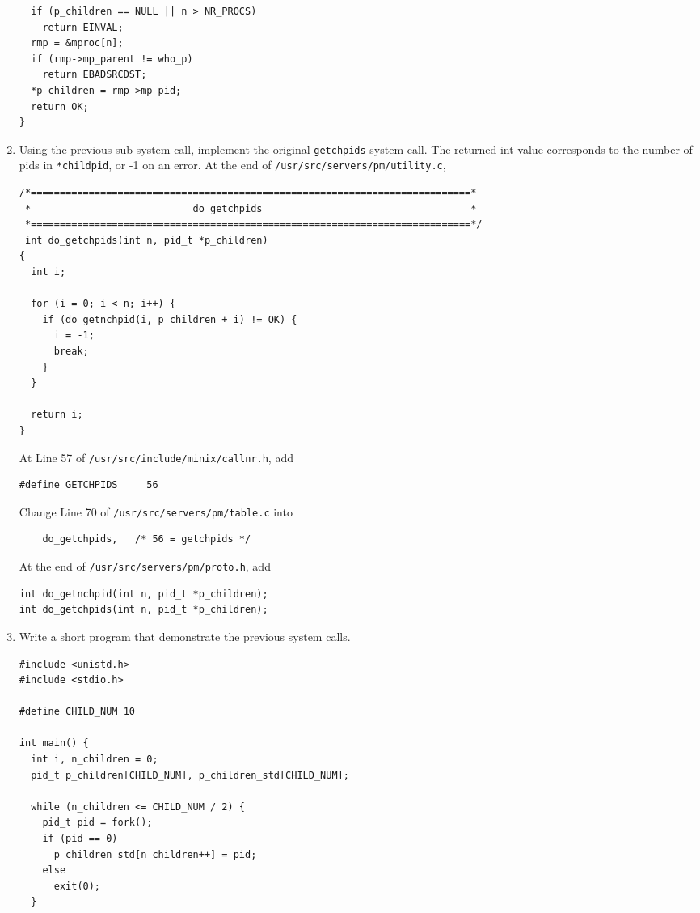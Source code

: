 \documentclass[a4paper]{article}
\begin{document}
\begin{enumerate}
\begin{verbatim}
  if (p_children == NULL || n > NR_PROCS)
  	return EINVAL;
  rmp = &mproc[n];
  if (rmp->mp_parent != who_p)
  	return EBADSRCDST;
  *p_children = rmp->mp_pid;
  return OK;
}
    \end{verbatim}
    \item Using the previous sub-system call, implement the original \texttt{getchpids} system call. The returned int value corresponds to the number of pids in \texttt{*childpid}, or -1 on an error.
    At the end of \texttt{/usr/src/servers/pm/utility.c},
    \begin{verbatim}
/*============================================================================*
 *                            do_getchpids                                    *
 *============================================================================*/
 int do_getchpids(int n, pid_t *p_children)
{
  int i;
  
  for (i = 0; i < n; i++) {
    if (do_getnchpid(i, p_children + i) != OK) {
      i = -1;
      break;
    }
  }
  
  return i;
}
    \end{verbatim}
    At Line 57 of \texttt{/usr/src/include/minix/callnr.h}, add
    \begin{verbatim}
#define GETCHPIDS	  56
    \end{verbatim}
    Change Line 70 of \texttt{/usr/src/servers/pm/table.c} into
    \begin{verbatim}
	do_getchpids,	/* 56 = getchpids */
    \end{verbatim}
    At the end of \texttt{/usr/src/servers/pm/proto.h}, add
    \begin{verbatim}
int do_getnchpid(int n, pid_t *p_children);
int do_getchpids(int n, pid_t *p_children);
    \end{verbatim}
    \item Write a short program that demonstrate the previous system calls.
    \begin{verbatim}
#include <unistd.h>
#include <stdio.h>

#define CHILD_NUM 10

int main() {
  int i, n_children = 0;
  pid_t p_children[CHILD_NUM], p_children_std[CHILD_NUM];

  while (n_children <= CHILD_NUM / 2) {
    pid_t pid = fork();
    if (pid == 0)
      p_children_std[n_children++] = pid;
    else
      exit(0);
  }
  

\end{verbatim}
\end{enumerate}
\end{document}

